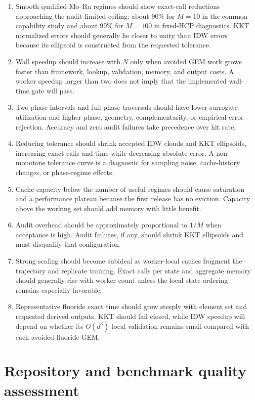 \documentclass[11pt]{article}
\begin{document}
\begin{enumerate}[leftmargin=*]
  \item Smooth qualified Mo--Ru regimes should show exact-call reductions approaching the
  audit-limited ceiling: about 90\% for \(M=10\) in the common capability study and about 99\% for
  \(M=100\) in fixed-HCP diagnostics.  KKT normalized errors should generally lie closer to unity
  than IDW errors because its ellipsoid is constructed from the requested tolerance.
  \item Wall speedup should increase with \(N\) only when avoided GEM work grows faster than
  framework, lookup, validation, memory, and output costs.  A worker speedup larger than two does
  not imply that the implemented wall-time gate will pass.
  \item Two-phase intervals and full phase traversals should have lower surrogate utilization and
  higher phase, geometry, complementarity, or empirical-error rejection.  Accuracy and zero audit
  failures take precedence over hit rate.
  \item Reducing tolerance should shrink accepted IDW clouds and KKT ellipsoids, increasing exact
  calls and time while decreasing absolute error.  A non-monotone tolerance curve is a diagnostic
  for sampling noise, cache-history changes, or phase-regime effects.
  \item Cache capacity below the number of useful regimes should cause saturation and a performance
  plateau because the first release has no eviction.  Capacity above the working set should add
  memory with little benefit.
  \item Audit overhead should be approximately proportional to \(1/M\) when acceptance is high.
  Audit failures, if any, should shrink KKT ellipsoids and must disqualify that configuration.
  \item Strong scaling should become subideal as worker-local caches fragment the trajectory and
  replicate training.  Exact calls per state and aggregate memory should generally rise with
  worker count unless the local state ordering remains especially favorable.
  \item Representative fluoride exact time should grow steeply with element set and requested
  derived outputs.  KKT should fail closed, while IDW speedup will depend on whether its
  \(O(d^3)\) local validation remains small compared with each avoided fluoride GEM.
\end{enumerate}

\section{Repository and benchmark quality assessment}
\end{document}
